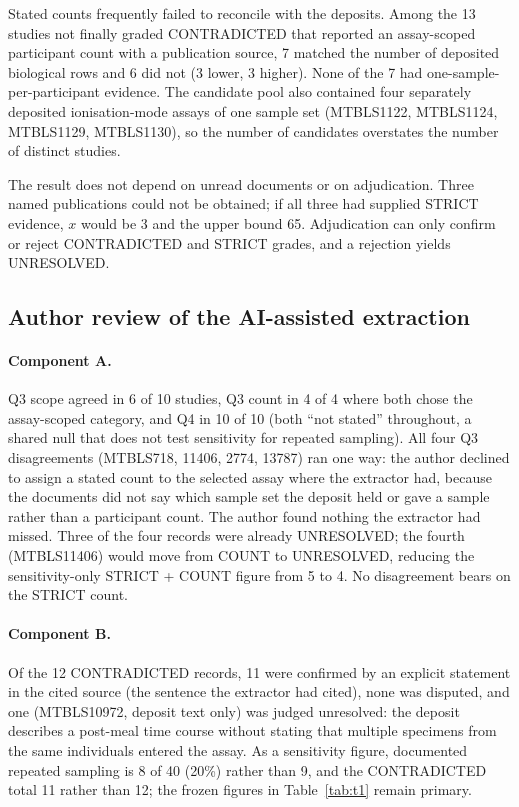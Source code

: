 Stated counts frequently failed to reconcile with the deposits. Among the 13 studies not finally graded
CONTRADICTED that reported an assay-scoped participant count with a publication source, 7 matched the number of
deposited biological rows and 6 did not (3 lower, 3 higher). None of the 7 had one-sample-per-participant evidence.
The candidate pool also contained four separately deposited ionisation-mode assays of one sample set
(MTBLS1122, MTBLS1124, MTBLS1129, MTBLS1130), so the number of candidates overstates the number of distinct studies.

The result does not depend on unread documents or on adjudication. Three named publications could not be obtained;
if all three had supplied STRICT evidence, $x$ would be 3 and the upper bound 65. Adjudication can only confirm or
reject CONTRADICTED and STRICT grades, and a rejection yields UNRESOLVED.

\subsection{Author review of the AI-assisted extraction}\label{sec:res-validation}

\paragraph{Component A.} Q3 scope agreed in 6 of 10 studies, Q3 count in 4 of 4 where both chose the assay-scoped
category, and Q4 in 10 of 10 (both ``not stated'' throughout, a shared null that does not test sensitivity for
repeated sampling). All four Q3 disagreements (MTBLS718, 11406, 2774, 13787) ran one way: the author declined to
assign a stated count to the selected assay where the extractor had, because the documents did not say which sample
set the deposit held or gave a sample rather than a participant count. The author found nothing the extractor had
missed. Three of the four records were already UNRESOLVED; the fourth (MTBLS11406) would move from COUNT to
UNRESOLVED, reducing the sensitivity-only STRICT + COUNT figure from 5 to 4. No disagreement bears on the STRICT count.

\paragraph{Component B.} Of the 12 CONTRADICTED records, 11 were confirmed by an explicit statement in the cited
source (the sentence the extractor had cited), none was disputed, and one (MTBLS10972, deposit text only) was judged
unresolved: the deposit describes a post-meal time course without stating that multiple specimens from the same
individuals entered the assay. As a sensitivity figure, documented repeated sampling is 8 of 40 (20\%) rather than 9,
and the CONTRADICTED total 11 rather than 12; the frozen figures in Table~\ref{tab:t1} remain primary.

